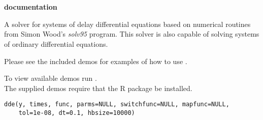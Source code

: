 \documentclass[letterpaper]{book}
\begin{document}
\setcounter{page}{13}
\chapter*{}
\begin{center}
{\textbf{\huge \R{} documentation}} \par{}
\par\bigskip{\large \today}
\end{center}
%
\begin{Description}\relax
A solver for systems of delay differential equations based on
numerical routines from Simon Wood's \emph{solv95} program. This
solver is also capable of solving systems of ordinary differential
equations. 

Please see the included demos for examples of how to use .

To view available demos run .\\{}
The supplied demos require that the R package 
be installed.
\end{Description}
%
\begin{Usage}
\begin{verbatim}
dde(y, times, func, parms=NULL, switchfunc=NULL, mapfunc=NULL, 
    tol=1e-08, dt=0.1, hbsize=10000) 
\end{verbatim}
\end{Usage}
%
\end{document}
